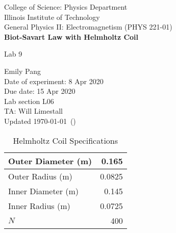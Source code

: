 \documentclass [12pt, letterpaper, twoside] {article}
\begin{document}
\begin {titlepage}
\begin {center}
College of Science: Physics Department \\
\vspace {0.1cm}
Illinois Institute of Technology \\
\vspace {0.1cm}
General Physics II: Electromagnetism (PHYS 221-01) \\
\vspace* {\fill}
\begingroup
\Large
\textbf {Biot-Savart Law with Helmholtz Coil}
\vspace {0.35cm}

\normalsize
Lab 9
\vspace {1.5cm}
\endgroup
\vspace* {\fill}
\end {center}

\vspace*{\fill}
\begin {flushright}
\footnotesize
Emily Pang \\
Date of experiment: 8 Apr 2020 \\
Due date: 15 Apr 2020 \\
Lab section L06 \\
TA: Will Limestall \\
Updated \usdate\today~(\currenttime)
\end{flushright}
\end{titlepage}

\begin{table}
  \centering
  \begin{tabular}{| l | r |}
    \hline\hline
    Outer Diameter (m) & 0.165 \\
    \hline
    Outer Radius (m) & 0.0825 \\
    \hline
    Inner Diameter (m) & 0.145 \\
    \hline
    Inner Radius (m) & 0.0725 \\
    \hline
    \(N\) & 400 \\
    \hline\hline
  \end{tabular}
  \caption{Helmholtz Coil Specifications}
\end{table}
\end{document}
